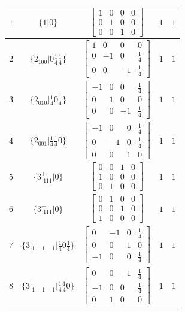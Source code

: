 \documentclass[fleqn,8pt]{jsarticle}
\begin{document}
\begin{longtable}{ccccc}
$ 1 $ & $ \{1|0\} $ & $ \begin{bmatrix} 1 & 0 & 0 & 0 \\ 0 & 1 & 0 & 0 \\ 0 & 0 & 1 & 0 \end{bmatrix} $ & $ 1 $ & $ 1 $ \\ \hline
$ 2 $ & $ \{2{}_{100}|0 \frac{1}{4} \frac{1}{4}\} $ & $ \begin{bmatrix} 1 & 0 & 0 & 0 \\ 0 & -1 & 0 & \frac{1}{4} \\ 0 & 0 & -1 & \frac{1}{4} \end{bmatrix} $ & $ 1 $ & $ 1 $ \\ \hline
$ 3 $ & $ \{2{}_{010}|\frac{1}{4} 0 \frac{1}{4}\} $ & $ \begin{bmatrix} -1 & 0 & 0 & \frac{1}{4} \\ 0 & 1 & 0 & 0 \\ 0 & 0 & -1 & \frac{1}{4} \end{bmatrix} $ & $ 1 $ & $ 1 $ \\ \hline
$ 4 $ & $ \{2{}_{001}|\frac{1}{4} \frac{1}{4} 0\} $ & $ \begin{bmatrix} -1 & 0 & 0 & \frac{1}{4} \\ 0 & -1 & 0 & \frac{1}{4} \\ 0 & 0 & 1 & 0 \end{bmatrix} $ & $ 1 $ & $ 1 $ \\ \hline
$ 5 $ & $ \{3^{+}_{\,\,111}|0\} $ & $ \begin{bmatrix} 0 & 0 & 1 & 0 \\ 1 & 0 & 0 & 0 \\ 0 & 1 & 0 & 0 \end{bmatrix} $ & $ 1 $ & $ 1 $ \\ \hline
$ 6 $ & $ \{3^{-}_{\,\,111}|0\} $ & $ \begin{bmatrix} 0 & 1 & 0 & 0 \\ 0 & 0 & 1 & 0 \\ 1 & 0 & 0 & 0 \end{bmatrix} $ & $ 1 $ & $ 1 $ \\ \hline
$ 7 $ & $ \{3^{-}_{\,\,1-1-1}|\frac{1}{4} 0 \frac{1}{4}\} $ & $ \begin{bmatrix} 0 & -1 & 0 & \frac{1}{4} \\ 0 & 0 & 1 & 0 \\ -1 & 0 & 0 & \frac{1}{4} \end{bmatrix} $ & $ 1 $ & $ 1 $ \\ \hline
$ 8 $ & $ \{3^{+}_{\,\,1-1-1}|\frac{1}{4} \frac{1}{4} 0\} $ & $ \begin{bmatrix} 0 & 0 & -1 & \frac{1}{4} \\ -1 & 0 & 0 & \frac{1}{4} \\ 0 & 1 & 0 & 0 \end{bmatrix} $ & $ 1 $ & $ 1 $ \\ \hline

\end{longtable}
\end{document}
